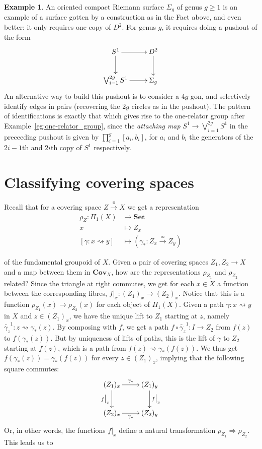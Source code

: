 \documentclass{tufte-handout}
\def\Set {\mathbf{Set}}
\def\Cov {\mathbf{Cov}}
\newcommand{\lecturenum}[1]{\marginnote{\color{red}Lecture #1}}
\theoremstyle{definition}
\newtheorem{example}{Example}
\begin{document}
\begin{example}
An oriented compact Riemann surface $\Sigma_g$ of genus $g\geq 1$ is an example of a 
 surface gotten by a construction as in the Fact above, and even better: it only 
 requires one copy of $D^2$. For genus $g$, it requires doing a pushout of the form
\[
\xymatrixnocompile{
	S^1 \ar[d] \ar[r] & D^2 \ar[d] \\
	\bigvee_{i=1}^{2g} S^1 \ar[r] & \Sigma_g
}
\]
An alternative way to build this pushout is to consider a $4g$-gon, and selectively identify edges in pairs (recovering the 
$2g$ circles as in the pushout). The pattern of identifications is exactly that which 
gives rise to the one-relator group after Example~\ref{eg:one-relator_group}, since the 
\emph{attaching map} $S^1 \to \bigvee_{i=1}^{2g} S^1$ in the preceeding pushout is given 
by $\prod_{i=1}^g[a_i,b_i]$, for $a_i$ and $b_i$ the generators of the $2i-1$th and 
$2i$th copy of $S^1$ respectively.
\end{example}

\section{Classifying covering spaces}

Recall\lecturenum{14}
 that for a covering space $Z\xrightarrow{\pi} X$ we get a representation 
\begin{align*}
\rho_Z\colon \Pi_1(X)& \longrightarrow \Set \\
x & \mapsto Z_x\\
[\gamma\colon x\rightsquigarrow y] & \mapsto \left(\gamma_*\colon Z_x\xrightarrow{\simeq} Z_y\right)
\end{align*}

of the fundamental groupoid of $X$. Given a pair of covering spaces $Z_1,Z_2\to X$ 
and a map between them in $\Cov_X$, how are the representations $\rho_{Z_1}$ and 
$\rho_{Z_2}$ related? Since the triangle at right commutes, we get for each $x\in X$ a 
function between the corresponding fibres, $f\big|_x \colon (Z_1)_x \to (Z_2)_x$. Notice 
that this is a function $\rho_{Z_1}(x) \to \rho_{Z_2}(x)$ for each object of $\Pi_1(X)$. 
Given a path $\gamma\colon x\rightsquigarrow y$ in $X$ and $z\in (Z_1)_x$, we have the 
unique lift to $Z_1$ starting at $z$, namely $\widetilde{\gamma_z}^1\colon 
z\rightsquigarrow \gamma_*(z)$. By composing with $f$, we get a path $f\circ 
\widetilde{\gamma_z}^1\colon I \to Z_2$ from $f(z)$ to $f(\gamma_*(z))$. But by 
uniqueness of lifts of paths, this is the lift of $\gamma$ 
to $Z_2$ starting at $f(z)$, which is a path from $f(z) \rightsquigarrow \gamma_*(f(z))$.
We thus get $f(\gamma_*(z)) = \gamma_*(f(z))$ for every $z\in (Z_1)_x$, implying that the
following square commutes:
\[
\xymatrix{
	(Z_1)_x \ar[r]^{\gamma_*}  \ar[d]_{f\big|_x} &  (Z_1)_y \ar[d]^{f\big|_y} \\
	(Z_2)_x \ar[r]_{\gamma_*} & (Z_2)_y
}
\]
Or, in other words, the functions $f\big|_x$ define a natural transformation 
$\rho_{Z_1}\Rightarrow \rho_{Z_2}$. This leads us to
\end{document}

